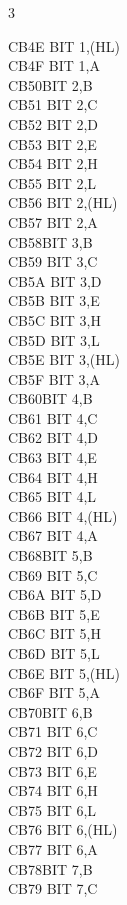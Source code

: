 \begin{multicols}{3}
{\begin{tabbing}
	CB4E\> 	BIT 1,(HL)\\
	CB4F\> 	BIT 1,A\\
	CB50\>BIT 2,B\\
	CB51\> 	BIT 2,C\\
	CB52\> 	BIT 2,D\\
	CB53\> 	BIT 2,E\\
	CB54\> 	BIT 2,H\\
	CB55\> 	BIT 2,L\\
	CB56\> 	BIT 2,(HL)\\
	CB57\> 	BIT 2,A\\
	CB58\>BIT 3,B\\
	CB59\> 	BIT 3,C\\
	CB5A\> 	BIT 3,D\\
	CB5B\> 	BIT 3,E\\
	CB5C\> 	BIT 3,H\\
	CB5D\> 	BIT 3,L\\
	CB5E\> 	BIT 3,(HL)\\
	CB5F\> 	BIT 3,A\\
	CB60\>BIT 4,B\\
	CB61\> 	BIT 4,C\\
	CB62\> 	BIT 4,D\\
	CB63\> 	BIT 4,E\\
	CB64\> 	BIT 4,H\\
	CB65\> 	BIT 4,L\\
	CB66\> 	BIT 4,(HL)\\
	CB67\> 	BIT 4,A\\
	CB68\>BIT 5,B\\
	CB69\> 	BIT 5,C\\
	CB6A\> 	BIT 5,D\\
	CB6B\> 	BIT 5,E\\
	CB6C\> 	BIT 5,H\\
	CB6D\> 	BIT 5,L\\
	CB6E\> 	BIT 5,(HL)\\
	CB6F\> 	BIT 5,A\\
	CB70\>BIT 6,B\\
	CB71\> 	BIT 6,C\\
	CB72\> 	BIT 6,D\\
	CB73\> 	BIT 6,E\\
	CB74\> 	BIT 6,H\\
	CB75\> 	BIT 6,L\\
	CB76\> 	BIT 6,(HL)\\
	CB77\> 	BIT 6,A\\
	CB78\>BIT 7,B\\
	CB79\> 	BIT 7,C\\

\end{tabbing}}
\end{multicols}
